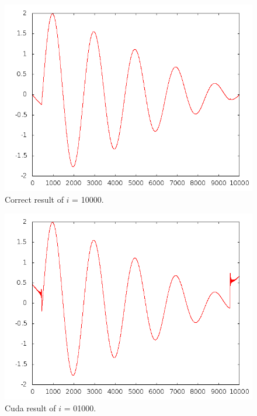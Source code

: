 \documentclass[10pt]{article}
\begin{document}
\begin{figure}[h]
  \centering
    \includegraphics[width=\textwidth]{assign1_10000.png}
  \caption{Correct result of $i$ = 10000.}
\end{figure}
\break
\begin{figure}[h]
  \centering
    \includegraphics[width=\textwidth]{assign4_10000.png}
  \caption{Cuda result of $i$ = 01000.}
\end{figure}
\break
\end{document}
